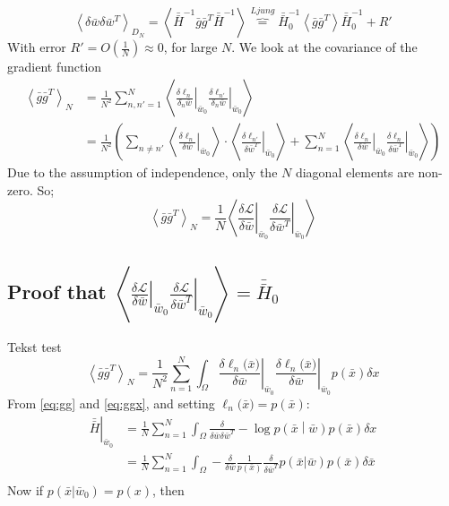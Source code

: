 \begin{equation}
\left\langle \delta \bar{w} \delta \bar{w}^T \right\rangle_{D_N} = 
\left\langle \bar{\bar{H}}^{-1} \bar{g} \bar{g}^T \bar{\bar{H}}^{-1} \right\rangle
\overbrace{=}^{Ljung} \bar{\bar{H}}^{-1}_0 \left\langle \bar{g}\bar{g}^T \right\rangle \bar{\bar{H}}^{-1}_0 + R'
\end{equation}
With error $R' = O\left(\frac{1}{N}\right) \approx 0$, for large $N$. We look at the covariance of the gradient function
\begin{align}
\left\langle \bar{g} \bar{g}^T \right\rangle_N &= 
\frac{1}{N^2}\sum_{n, n' = 1}^N \left\langle \left. \frac{\delta \ell_n}{\delta_n \bar{w}} \right|_{\bar{w}_0} \left.\frac{\delta \ell_{n'}}{\delta_n \bar{w}} \right|_{\bar{w}_0} \right\rangle\\
 & = \frac{1}{N^2} \left(\sum_{n \neq n'} \left\langle \left. \frac{\delta \ell_n}{\delta \bar{w}} \right|_{\bar{w}_0} \right\rangle \cdot \left\langle \left. \frac{\delta \ell_{n'}}{\delta \bar{w}^T} \right|_{\bar{w}_0} \right\rangle 
 + \sum_{n =1 }^N \left\langle \left. \frac{\delta \ell_n}{\delta \bar{w}} \right|_{\bar{w}_0} \left. \frac{\delta \ell_n}{\delta \bar{w}^T} \right|_{\bar{w}_0}  \right\rangle \right)
\end{align}
Due to the assumption of independence, only the $N$ diagonal elements are non-zero. So;
\begin{equation}
\left\langle \bar{g} \bar{g}^T \right\rangle_N = \frac{1}{N} \left\langle \left. \frac{\delta \mathcal{L}}{\delta \bar{w}} \right|_{\bar{w}_0} \left. \frac{\delta \mathcal{L}}{\delta \bar{w}^T} \right|_{\bar{w}_0}  \right\rangle \label{eq:gg}
\end{equation}


\subsection{Proof that $\left\langle \left. \frac{\delta \mathcal{L}}{\delta \bar{w}} \right|_{\bar{w}_0} \left. \frac{\delta \mathcal{L}}{\delta \bar{w}^T} \right|_{\bar{w}_0}  \right\rangle = \bar{\bar{H}}_0$ }
Tekst test
\begin{equation}
\left\langle \bar{g} \bar{g}^T \right\rangle_N = 
\frac{1}{N^2} \sum_{n = 1}^N \int_{\Omega} 
\left. \frac{\delta \ell_n({\bar{x})}}{\delta \bar{w}} \right|_{\bar{w}_0}
\left. \frac{\delta \ell_n({\bar{x})}}{\delta \bar{w}} \right|_{\bar{w}_0}
p(\bar{x}) \delta x \label{eq:ggx}
\end{equation}
From \eqref{eq:gg} and \eqref{eq:ggx}, and setting $ \ell_n({\bar{x})} = p(\bar{x})$:
\begin{align}
\left.\bar{\bar{H}} \right|_{\bar{w}_0} &= 
\frac{1}{N} \sum_{n = 1}^N \int_{\Omega} 
\frac{\delta}{\delta \bar{w} \delta \bar{w}^T}
- \log p\left(\bar{x} \middle| \bar{w} \right) p(\bar{x}) \delta x\\
 &= \frac{1}{N} \sum_{n = 1}^N \int_{\Omega} - \frac{\delta}{\delta \bar{w}} \frac{1}{p\left(\bar{x}\right)}\frac{\delta }{\delta \bar{w}^T} p(\bar{x} | \bar{w}) p(\bar{x}) \delta \bar{x}\\
\end{align}
Now if $p(\bar{x}|\bar{w}_0) = p(x)$, then
